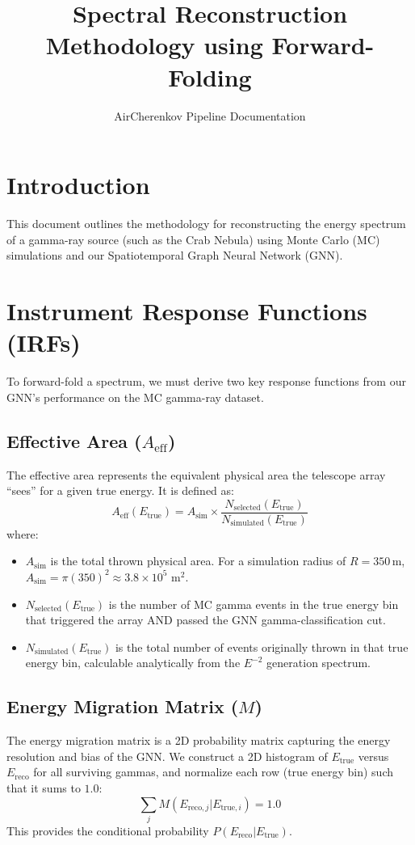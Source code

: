\documentclass[12pt]{article}
\title{Spectral Reconstruction Methodology using Forward-Folding}
\author{AirCherenkov Pipeline Documentation}
\date{}
\begin{document}
\maketitle

\section{Introduction}
This document outlines the methodology for reconstructing the energy spectrum of a gamma-ray source (such as the Crab Nebula) using Monte Carlo (MC) simulations and our Spatiotemporal Graph Neural Network (GNN). 

\section{Instrument Response Functions (IRFs)}
To forward-fold a spectrum, we must derive two key response functions from our GNN's performance on the MC gamma-ray dataset.

\subsection{Effective Area ($A_{\text{eff}}$)}
The effective area represents the equivalent physical area the telescope array ``sees'' for a given true energy. 
It is defined as:
\begin{equation}
A_{\text{eff}}(E_{\text{true}}) = A_{\text{sim}} \times \frac{N_{\text{selected}}(E_{\text{true}})}{N_{\text{simulated}}(E_{\text{true}})}
\end{equation}
where:
\begin{itemize}
    \item $A_{\text{sim}}$ is the total thrown physical area. For a simulation radius of $R = 350$\,m, $A_{\text{sim}} = \pi (350)^2 \approx 3.8 \times 10^5 \text{ m}^2$.
    \item $N_{\text{selected}}(E_{\text{true}})$ is the number of MC gamma events in the true energy bin that triggered the array AND passed the GNN gamma-classification cut.
    \item $N_{\text{simulated}}(E_{\text{true}})$ is the total number of events originally thrown in that true energy bin, calculable analytically from the $E^{-2}$ generation spectrum.
\end{itemize}

\subsection{Energy Migration Matrix ($M$)}
The energy migration matrix is a 2D probability matrix capturing the energy resolution and bias of the GNN. We construct a 2D histogram of $E_{\text{true}}$ versus $E_{\text{reco}}$ for all surviving gammas, and normalize each row (true energy bin) such that it sums to $1.0$:
\begin{equation}
\sum_{j} M(E_{\text{reco}, j} | E_{\text{true}, i}) = 1.0
\end{equation}
This provides the conditional probability $P(E_{\text{reco}} | E_{\text{true}})$.
\end{document}
